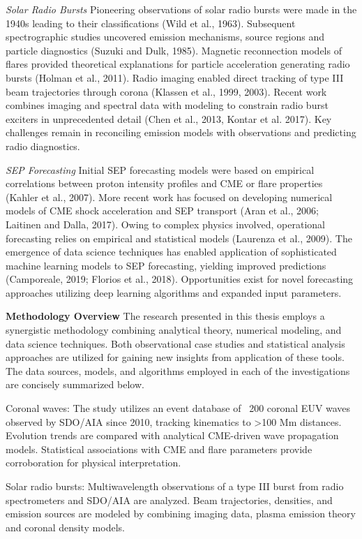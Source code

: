 \textit{Solar Radio Bursts}
Pioneering observations of solar radio bursts were made in the 1940s leading to their classifications (Wild et al., 1963). Subsequent spectrographic studies uncovered emission mechanisms, source regions and particle diagnostics (Suzuki and Dulk, 1985). Magnetic reconnection models of flares provided theoretical explanations for particle acceleration generating radio bursts (Holman et al., 2011). Radio imaging enabled direct tracking of type III beam trajectories through corona (Klassen et al., 1999, 2003). Recent work combines imaging and spectral data with modeling to constrain radio burst exciters in unprecedented detail (Chen et al., 2013, Kontar et al. 2017). Key challenges remain in reconciling emission models with observations and predicting radio diagnostics.

\textit{SEP Forecasting}
Initial SEP forecasting models were based on empirical correlations between proton intensity profiles and CME or flare properties (Kahler et al., 2007). More recent work has focused on developing numerical models of CME shock acceleration and SEP transport (Aran et al., 2006; Laitinen and Dalla, 2017). Owing to complex physics involved, operational forecasting relies on empirical and statistical models (Laurenza et al., 2009). The emergence of data science techniques has enabled application of sophisticated machine learning models to SEP forecasting, yielding improved predictions (Camporeale, 2019; Florios et al., 2018). Opportunities exist for novel forecasting approaches utilizing deep learning algorithms and expanded input parameters.

\textbf{Methodology Overview}
The research presented in this thesis employs a synergistic methodology combining analytical theory, numerical modeling, and data science techniques. Both observational case studies and statistical analysis approaches are utilized for gaining new insights from application of these tools. The data sources, models, and algorithms employed in each of the investigations are concisely summarized below.

Coronal waves: The study utilizes an event database of ~200 coronal EUV waves observed by SDO/AIA since 2010, tracking kinematics to >100 Mm distances. Evolution trends are compared with analytical CME-driven wave propagation models. Statistical associations with CME and flare parameters provide corroboration for physical interpretation.

Solar radio bursts: Multiwavelength observations of a type III burst from radio spectrometers and SDO/AIA are analyzed. Beam trajectories, densities, and emission sources are modeled by combining imaging data, plasma emission theory and coronal density models. 

